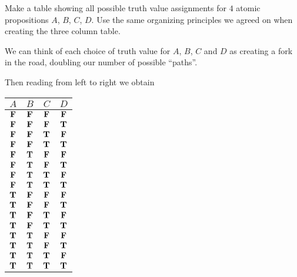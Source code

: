 \begin{xca}

Make a table showing all possible truth value assignments for $4$ atomic propositions $A$, $B$, $C$, $D$.  Use the same organizing principles we agreed on when creating the three column table.
	
\end{xca}

\begin{solutions}
		We can think of each choice of truth value for $A$, $B$, $C$ and $D$ as creating a fork in the road, doubling our number of possible ``paths''.
		
		

		\begin{center}
		\end{center}
	
	Then reading from left to right we obtain
	
			\begin{table}[h!]
		\begin{center}
			\begin{tabular}{c|c|c|c} 
				$A$ & $B$ & $C$  & $D$ \\
				\hline
				$\F$ & $\F$ & $\F$  & $\F$ \\ \hline
				$\F$ & $\F$ & $\F$  & $\T$ \\ \hline
				$\F$ & $\F$ & $\T$  & $\F$ \\ \hline
				$\F$ & $\F$ & $\T$  & $\T$ \\ \hline
				$\F$ & $\T$ & $\F$  & $\F$ \\ \hline
				$\F$ & $\T$ & $\F$  & $\T$ \\ \hline
				$\F$ & $\T$ & $\T$  & $\F$ \\ \hline
				$\F$ & $\T$ & $\T$  & $\T$ \\ \hline
				$\T$ & $\F$ & $\F$  & $\F$ \\ \hline
				$\T$ & $\F$ & $\F$  & $\T$ \\ \hline
				$\T$ & $\F$ & $\T$  & $\F$ \\ \hline
				$\T$ & $\F$ & $\T$  & $\T$ \\ \hline
				$\T$ & $\T$ & $\F$  & $\F$ \\ \hline
				$\T$ & $\T$ & $\F$  & $\T$ \\ \hline
				$\T$ & $\T$ & $\T$  & $\F$ \\ \hline
				$\T$ & $\T$ & $\T$  & $\T$ \\ 
			\end{tabular}
		\end{center}
	\end{table}
	
	\end{solutions}

